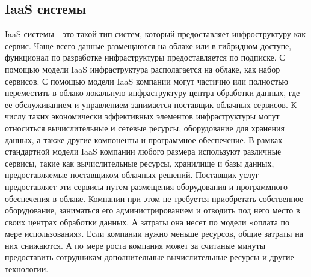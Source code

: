 \subsection{IaaS системы}\label{sec:ch2/sec1/sub6}
IaaS системы - это такой тип систем, который предоставляет инфроструктуру как сервис. Чаще всего данные размещаются на облаке или в гибридном доступе, функционал по разработке инфраструктуры предоставляется по подписке. С помощью модели IaaS инфраструктура располагается на облаке, как набор сервисов.
С помощью модели IaaS компании могут частично или полностью переместить в облако локальную инфраструктуру центра обработки данных, где ее обслуживанием и управлением занимается поставщик облачных сервисов. К числу таких экономически эффективных элементов инфраструктуры могут относиться вычислительные и сетевые ресурсы, оборудование для хранения данных, а также другие компоненты и программное обеспечение. 
В рамках стандартной модели IaaS компании любого размера используют различные сервисы, такие как вычислительные ресурсы, хранилище и базы данных, предоставляемые поставщиком облачных решений. Поставщик услуг предоставляет эти сервисы путем размещения оборудования и программного обеспечения в облаке. Компании при этом не требуется приобретать собственное оборудование, заниматься его администрированием и отводить под него место в своих центрах обработки данных. А затраты она несет по модели «оплата по мере использования». Если компании нужно меньше ресурсов, общие затраты на них снижаются. А по мере роста компания может за считаные минуты предоставить сотрудникам дополнительные вычислительные ресурсы и другие технологии.
